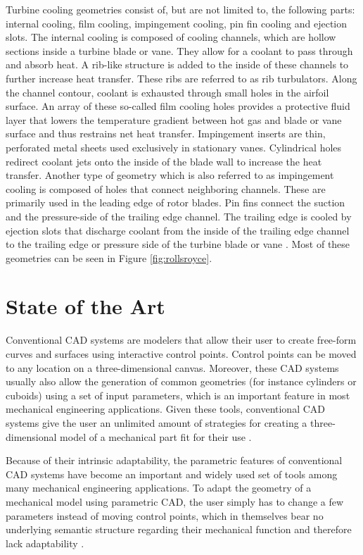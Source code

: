 \documentclass[a4paper, 11pt]{report}
\theoremstyle{definition}
\begin{document}
		Turbine cooling geometries consist of, but are not limited to, the following parts: internal cooling, film cooling, impingement cooling, pin fin cooling and ejection slots. The internal cooling is composed of cooling channels, which are hollow sections inside a turbine blade or vane. They allow for a coolant to pass through and absorb heat. A rib-like structure is added to the inside of these channels to further increase heat transfer. These ribs are referred to as rib turbulators. Along the channel contour, coolant is exhausted through small holes in the airfoil surface. An array of these so-called film cooling holes provides a protective fluid layer that lowers the temperature gradient between hot gas and blade or vane surface and thus restrains net heat transfer. Impingement inserts are thin, perforated metal sheets used exclusively in stationary vanes. Cylindrical holes redirect coolant jets onto the inside of the blade wall to increase the heat transfer. Another type of geometry which is also referred to as impingement cooling is composed of holes that connect neighboring channels. These are primarily used in the leading edge of rotor blades. Pin fins connect the suction and the pressure-side of the trailing edge channel. The trailing edge is cooled by ejection slots that discharge coolant from the inside of the trailing edge channel to the trailing edge or pressure side of the turbine blade or vane \cite{Giampaolo2020}. Most of these geometries can be seen in Figure \ref{fig:rollsroyce}.

	\section{State of the Art}
		Conventional CAD systems are modelers that allow their user to create free-form curves and surfaces using interactive control points. Control points can be moved to any location on a three-dimensional canvas. Moreover, these CAD systems usually also allow the generation of common geometries (for instance cylinders or cuboids) using a set of input parameters, which is an important feature in most mechanical engineering applications. Given these tools, conventional CAD systems give the user an unlimited amount of strategies for creating a three-dimensional model of a mechanical part fit for their use \cite{Camba2016}.

		Because of their intrinsic adaptability, the parametric features of conventional CAD systems have become an important and widely used set of tools among many mechanical engineering applications. To adapt the geometry of a mechanical model using parametric CAD, the user simply has to change a few parameters instead of moving control points, which in themselves bear no underlying semantic structure regarding their mechanical function and therefore lack adaptability \cite{Shah1995}.
\end{document}
